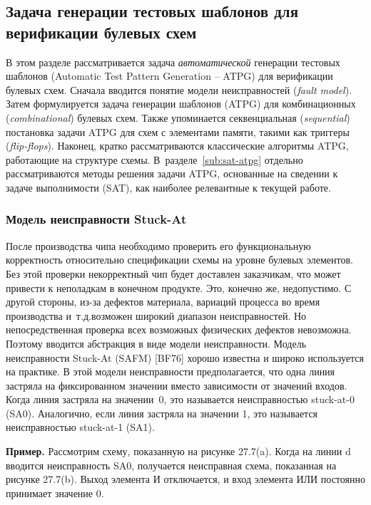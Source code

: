 \subsection{Задача генерации тестовых шаблонов для верификации булевых схем}
\label{sub:atpg}

В этом разделе рассматривается задача \textit{автоматической} генерации тестовых шаблонов (Automatic Test Pattern Generation \--- ATPG) для верификации булевых схем.
Сначала вводится понятие модели неисправностей (\textit{fault model}).
Затем формулируется задача генерации шаблонов (ATPG) для комбинационных (\textit{combinational}) булевых схем.
Также упоминается секвенциальная (\textit{sequential}) постановка задачи ATPG для схем с элементами памяти, такими как триггеры (\textit{flip-flops}).
Наконец, кратко рассматриваются классические алгоритмы ATPG, работающие на структуре схемы.
В~разделе~\ref{sub:sat-atpg} отдельно рассматриваются методы решения задачи ATPG, основанные на сведении к задаче выполнимости (SAT), как наиболее релевантные к текущей работе.

\subsubsection{Модель неисправности Stuck-At}

После производства чипа необходимо проверить его функциональную корректность относительно спецификации схемы на уровне булевых элементов.
Без этой проверки некорректный чип будет доставлен заказчикам, что может привести к неполадкам в конечном продукте. Это, конечно же, недопустимо.
С другой стороны, из-за дефектов материала, вариаций процесса во время производства и~т.\@\:д.\@ возможен широкий диапазон неисправностей.
Но непосредственная проверка всех возможных физических дефектов невозможна.
Поэтому вводится абстракция в виде модели неисправности.
Модель неисправности Stuck-At (SAFM) [BF76] хорошо известна и широко используется на практике.
В этой модели неисправности предполагается, что одна линия застряла на фиксированном значении вместо зависимости от значений входов.
Когда линия застряла на значении~0, это называется неисправностью stuck-at-0 (SA0).
Аналогично, если линия застряла на значении 1, это называется неисправностью stuck-at-1 (SA1).

\textbf{Пример.}
Рассмотрим схему, показанную на рисунке 27.7(a). Когда на линии d вводится неисправность SA0, получается неисправная схема, показанная на рисунке 27.7(b). Выход элемента И отключается, и вход элемента ИЛИ постоянно принимает значение 0.

